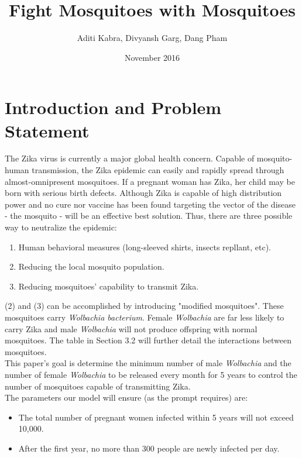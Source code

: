 \documentclass{article}
\title{Fight Mosquitoes with Mosquitoes}
\author{Aditi Kabra, Divyansh Garg, Dang Pham}
\date{November 2016}
\begin{document}
\maketitle

\tableofcontents

\vspace{15cm}

\section{Introduction and Problem Statement}

The Zika virus is currently a major global health concern. Capable of mosquito-human transmission, the Zika epidemic can easily and rapidly spread through almost-omnipresent mosquitoes. If a pregnant woman has Zika, her child may be born with serious birth defects. Although Zika is capable of high distribution power and no cure nor vaccine has been found targeting the vector of the disease - the mosquito - will be an effective best solution. Thus, there are three possible way to neutralize the epidemic:
\begin{enumerate}
    \item Human behavioral measures (long-sleeved shirts, insects repllant, etc).
    \item Reducing the local mosquito population.
    \item Reducing mosquitoes' capability to transmit Zika.
\end{enumerate}

(2) and (3) can be accomplished by introducing "modified mosquitoes". These mosquitoes carry \textit{Wolbachia bacterium}. Female \textit{Wolbachia} are far less likely to carry Zika and male \textit{Wolbachia} will not produce offspring with normal mosquitoes. The table in Section 3.2 will further detail the interactions between mosquitoes.\\

This paper's goal is determine the minimum number of male \textit{Wolbachia} and the number of female \textit{Wolbachia} to be released every month for 5 years to control the number of mosquitoes capable of transmitting Zika. \\ 

The parameters our model will ensure (as the prompt requires) are:
\begin{itemize}
    \item The total number of pregnant women infected within 5 years will not exceed 10,000.
    \item After the first year, no more than 300 people are newly infected per day.
\end{itemize}
\end{document}
